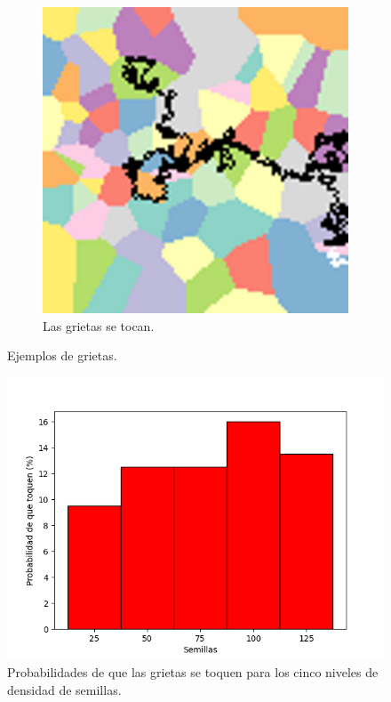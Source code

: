 \documentclass{article}
\begin{document}
\begin{figure}
\begin{subfigure}[b]{0.49\textwidth}
         \includegraphics[width=\textwidth]{p4pgbn_75_8.png}
         \caption{Las grietas se tocan.}
         \label{fig:tocan}
     \end{subfigure}
     \caption{Ejemplos de grietas.}
     \label{grietas}
\end{figure}

\begin{figure}
    \centering
    \includegraphics[width=\textwidth]{Voronoi.png}
    \caption{Probabilidades de que las grietas se toquen para los cinco niveles de densidad de semillas.}
    \label{prob}
\end{figure}
\end{document}
